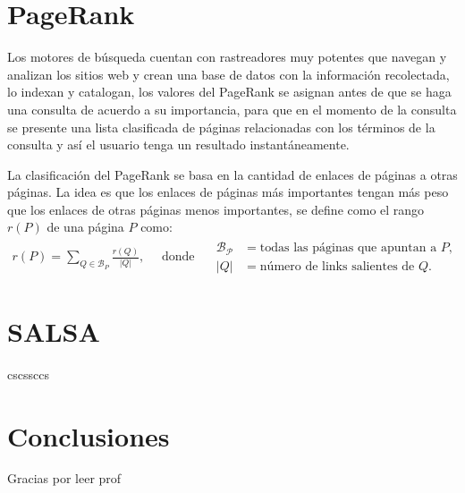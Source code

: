\documentclass[12pt]{article}
\begin{document}
\section{PageRank}
Los motores de búsqueda cuentan con rastreadores muy potentes que navegan y analizan los sitios web y crean una base de datos con la información recolectada, lo indexan y catalogan, los valores del PageRank se asignan antes de que se haga una consulta de acuerdo a su importancia, para que en el momento de la consulta se presente una lista clasificada de páginas relacionadas con los términos de la consulta y así el usuario tenga un resultado instantáneamente. \par
La clasificación del PageRank se basa en la cantidad de enlaces de páginas a otras páginas. La idea es que los enlaces de páginas más importantes tengan más peso que los enlaces de otras páginas menos importantes, se define como el rango $r(P)$ de una página $P$ como:
\begin{gather*}
    r(P) = \sum_{Q\in \mathcal{B}_P} \frac{r(Q)}{|Q|}, \quad \text{      donde      } \quad
    \begin{split}
        \mathcal{{B}_P} &= \text{todas las páginas que apuntan a } P, \\ 
        |Q| &= \text{número de links salientes de } Q.
    \end{split}
\end{gather*}

\section{SALSA}
cscssccs

\section{Conclusiones}
Gracias por leer prof
   
\end{document}
